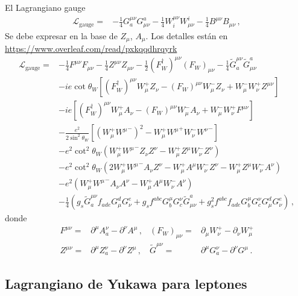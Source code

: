 \begin{frame}
El Lagrangiano gauge
\begin{align}
  \mathcal{L}_{\text{gauge}}=& -\tfrac{1}{4}G^{\mu\nu}_a G_{\mu\nu}^a-\tfrac{1}{4}W^{\mu\nu}_i W_{\mu\nu}^i-\tfrac{1}{4}B^{\mu\nu} B_{\mu\nu}\,,
\end{align}
Se debe expresar en la base de $Z_\mu$, $A_\mu$. Los detalles están en \url{https://www.overleaf.com/read/pxkqqdhrqyrk}
\begin{align}
\label{eq:lgaguefin}
\mathcal{L}_{\text{gauge}}=&  -\tfrac{1}{4}F^{\mu\nu} F_{\mu\nu}-\tfrac{1}{4}Z^{\mu\nu} Z_{\mu\nu}-\tfrac{1}{2}(F_W^\dagger)^{\mu\nu} (F_W)_{\mu\nu}
- \tfrac{1}{4}\widetilde{G}^{\mu\nu}_a \widetilde{G}_{\mu\nu}^a\nonumber\\
&-ie\cot\theta_W\left[(F_W^\dagger)^{\mu\nu}W_\mu^+ Z_\nu-(F_W)^{\mu\nu}W_\mu^- Z_\nu+W_\mu^-W_\nu^+Z^{\mu\nu}\right]\nonumber\\
&-ie\left[(F_W^\dagger)^{\mu\nu}W_\mu^+ A_\nu-(F_W)^{\mu\nu}W_\mu^- A_\nu+W_\mu^-W_\nu^+F^{\mu\nu}\right]\nonumber\\
&-\frac{e^2}{2\sin^2\theta_W}\left[\left(W_\mu^+{W^\mu}^-\right)^2-W_\mu^+{W^\mu}^+W_\nu^-{W^\nu}^-\right] \nonumber\\
&-e^2\cot^2\theta_W\left(W_\mu^+{W^\mu}^-Z_\nu Z^\nu-W_\mu^+Z^\mu W_\nu^-Z^\nu\right)\nonumber\\
&-e^2\cot^2\theta_W\left(2W_\mu^+{W^\mu}^-A_\nu Z^\nu-W_\mu^+A^\mu W_\nu^-Z^\nu-W_\mu^+Z^\mu W_\nu^-A^\nu\right)\nonumber\\
&-e^2\left(W_\mu^+{W^\mu}^-A_\nu A^\nu-W_\mu^+A^\mu W_\nu^-A^\nu\right)\nonumber\\
&- \frac{1}{4}\left(g_s\widetilde{G}^{\mu\nu}_af_{a d e}G^d_\mu G^e_\nu
    +g_sf^{a b c}G_b^\mu G_c^\nu\widetilde{G}_{\mu\nu}^a
    +g_s^2f^{a b c}f_{a d e}G_b^\mu G_c^\nu G^d_\mu G^e_\nu\right)\,,
\end{align}
donde
\begin{align}
  {F}^{\mu\nu}=&\partial^\mu A^\nu_a-\partial^\nu A^\mu\,, &  (F_W)_{\mu\nu}=&\partial_\mu W^+_\nu-\partial_\nu W^+_\mu\nonumber\\
  {Z}^{\mu\nu}=&\partial^\mu Z^\nu_a-\partial^\nu Z^\mu\,,&  \widetilde{G}^{\mu\nu}=&\partial^\mu G^\nu_a-\partial^\nu G^\mu\,.
\end{align}

\end{frame}


\subsection{Lagrangiano  de Yukawa para leptones}

